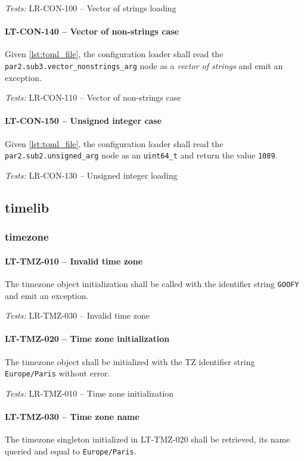 \textit{Tests: } LR-CON-100 -- Vector of strings loading

\paragraph{LT-CON-140 -- Vector of non-strings case}
Given \cref{lst:toml_file}, the configuration loader shall read the
\lstinline{par2.sub3.vector_nonstrings_arg} node as a \emph{vector of strings}
and emit an exception.

\textit{Tests: } LR-CON-110 -- Vector of non-strings case

\paragraph{LT-CON-150 -- Unsigned integer case}
Given \cref{lst:toml_file}, the configuration loader shall read
the \lstinline{par2.sub2.unsigned_arg} node as an
\lstinline{uint64_t} and return the value \lstinline{1089}.

\textit{Tests: } LR-CON-130 -- Unsigned integer loading

\subsection{time\textunderscore lib}
\subsubsection{time\textunderscore zone}
\paragraph{LT-TMZ-010 -- Invalid time zone}
The time\textunderscore zone object initialization shall be called with
the identifier string \lstinline{GOOFY} and emit an exception.

\textit{Tests: } LR-TMZ-030 -- Invalid time zone

\paragraph{LT-TMZ-020 -- Time zone initialization}
The time\textunderscore zone object shall be initialized with the TZ
identifier string \lstinline{Europe/Paris} without error.

\textit{Tests: } LR-TMZ-010 -- Time zone initialization

\paragraph{LT-TMZ-030 -- Time zone name}
The time\textunderscore zone singleton initialized in LT-TMZ-020 shall
be retrieved, its name queried and equal to \lstinline{Europe/Paris}.

